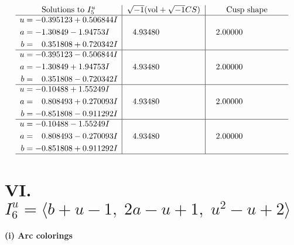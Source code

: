 \documentclass[1p]{elsarticle_modified}
\theoremstyle{definition}
\newcommand{\I}{\sqrt{-1}}
\begin{document}
$$\begin{array}{c|c|c}  
\text{Solutions to }I^u_{5}& \I (\text{vol} + \sqrt{-1}CS) & \text{Cusp shape}\\
 \hline 
\begin{aligned}
u &= -0.395123 + 0.506844 I \\
a &= -1.30849 - 1.94753 I \\
b &= \phantom{-}0.351808 + 0.720342 I\end{aligned}
 & \phantom{-}4.93480\phantom{ +0.000000I} & \phantom{-}2.00000\phantom{ +0.000000I} \\ \hline\begin{aligned}
u &= -0.395123 - 0.506844 I \\
a &= -1.30849 + 1.94753 I \\
b &= \phantom{-}0.351808 - 0.720342 I\end{aligned}
 & \phantom{-}4.93480\phantom{ +0.000000I} & \phantom{-}2.00000\phantom{ +0.000000I} \\ \hline\begin{aligned}
u &= -0.10488 + 1.55249 I \\
a &= \phantom{-}0.808493 + 0.270093 I \\
b &= -0.851808 - 0.911292 I\end{aligned}
 & \phantom{-}4.93480\phantom{ +0.000000I} & \phantom{-}2.00000\phantom{ +0.000000I} \\ \hline\begin{aligned}
u &= -0.10488 - 1.55249 I \\
a &= \phantom{-}0.808493 - 0.270093 I \\
b &= -0.851808 + 0.911292 I\end{aligned}
 & \phantom{-}4.93480\phantom{ +0.000000I} & \phantom{-}2.00000\phantom{ +0.000000I}\\
 \hline 
 \end{array}$$\newpage\newpage\renewcommand{\arraystretch}{1}
\centering \section*{VI. $I^u_{6}= \langle b+u-1,\;2 a- u+1,\;u^2- u+2 \rangle$}
\flushleft \textbf{(i) Arc colorings}\\
\end{document}
